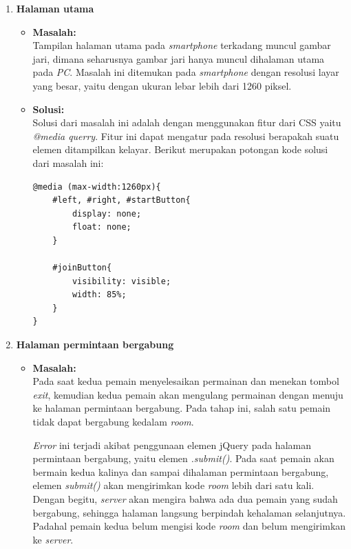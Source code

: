 \begin{enumerate}
	\item \textbf{Halaman utama}
	\begin{itemize}
		\item \textbf{Masalah:} \\
		Tampilan halaman utama pada \textit{smartphone} terkadang muncul gambar jari, dimana seharusnya gambar jari hanya muncul dihalaman utama pada \textit{PC}. Masalah ini ditemukan pada \textit{smartphone} dengan resolusi layar yang besar, yaitu dengan ukuran lebar lebih dari 1260 piksel.
		
		\item \textbf{Solusi:} \\
		Solusi dari masalah ini adalah dengan menggunakan fitur dari CSS yaitu \textit{@media querry}. Fitur ini dapat mengatur pada resolusi berapakah suatu elemen ditampilkan kelayar. Berikut merupakan potongan kode solusi dari masalah ini:
		
\begin{lstlisting}[caption={Fitur CSS \textit{@media querry}}, label={lst:mediaQuerry},captionpos=b]
@media (max-width:1260px){
	#left, #right, #startButton{
		display: none;
		float: none;
	}
			
	#joinButton{
		visibility: visible;
		width: 85%;
	}
}
\end{lstlisting}
	\end{itemize}

	\item \textbf{Halaman permintaan bergabung}
	\begin{itemize}
		\item \textbf{Masalah:} \\
		Pada saat kedua pemain menyelesaikan permainan dan menekan tombol \textit{exit}, kemudian kedua pemain akan mengulang permainan dengan menuju ke halaman permintaan bergabung. Pada tahap ini, salah satu pemain tidak dapat bergabung kedalam \textit{room}.
		
		\textit{Error} ini terjadi akibat penggunaan elemen jQuery pada halaman permintaan bergabung, yaitu elemen \textit{.submit()}. Pada saat pemain akan bermain kedua kalinya dan sampai dihalaman permintaan bergabung, elemen \textit{submit()} akan mengirimkan kode \textit{room} lebih dari satu kali. Dengan begitu, \textit{server} akan mengira bahwa ada dua pemain yang sudah bergabung, sehingga halaman langsung berpindah kehalaman selanjutnya. Padahal pemain kedua belum mengisi kode \textit{room} dan belum mengirimkan ke \textit{server}.
		

\end{itemize}
\end{enumerate}
